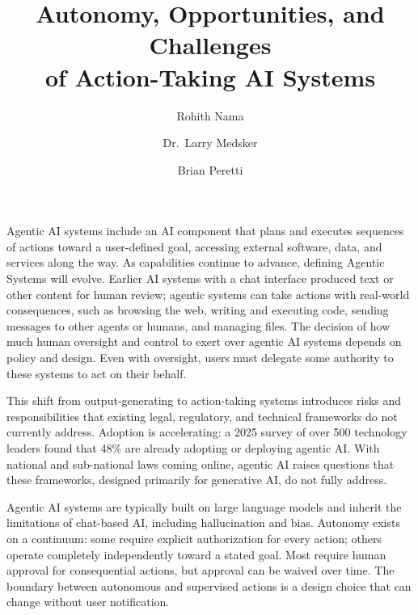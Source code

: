 \documentclass[acmlarge,nonacm,natbib=false]{acmart}
\begin{document}
\title[Autonomy, Opportunities, and Challenges]{Autonomy, Opportunities,
  and Challenges\\of Action-Taking AI Systems}

\author{Rohith Nama}
\author{Dr.~Larry Medsker}
\author{Brian Peretti}

\maketechbrief

\begin{techbriefbody}
Agentic AI systems include an AI component that plans and executes
sequences of actions toward a user-defined goal, accessing external
software, data, and services along the way. As capabilities continue to
advance, defining Agentic Systems will evolve. Earlier AI systems with a
chat interface produced text or other content for human review; agentic
systems can take actions with real-world consequences, such as browsing
the web, writing and executing code, sending messages to other agents or
humans, and managing files. The decision of how much human oversight and
control to exert over agentic AI systems depends on policy and design.
Even with oversight, users must delegate some authority to these systems
to act on their behalf.

This shift from output-generating to action-taking systems introduces
risks and responsibilities that existing legal, regulatory, and technical
frameworks do not currently address. Adoption is accelerating: a 2025
survey of over 500 technology leaders found that 48\% are already
adopting or deploying agentic AI.\cite{ey2025pulse} With national and
sub-national laws coming online, agentic AI raises questions that these
frameworks, designed primarily for generative AI, do not fully address.

Agentic AI systems are typically built on large language models and
inherit the limitations of chat-based AI, including hallucination and
bias. Autonomy exists on a continuum: some require explicit authorization
for every action; others operate completely independently toward a
stated goal. Most require human approval for consequential actions, but
approval can be waived over time. The boundary between autonomous and
supervised actions is a design choice that can change without user
notification.


\end{techbriefbody}
\end{document}
